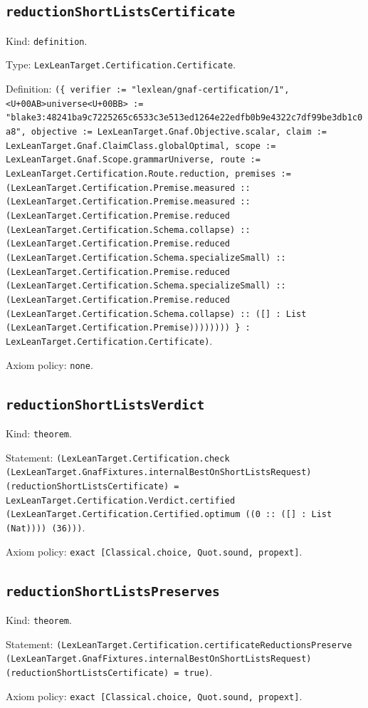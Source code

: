 \documentclass[11pt]{article}
\begin{document}
\subsection*{\texttt{reductionShortListsCertificate}}
\noindent Kind: \texttt{definition}.\par
\noindent Type: \texttt{LexLeanTarget.Certification.Certificate}.\par
\noindent Definition: \texttt{(\{ verifier := "lexlean/gnaf-certification/1", <U+00AB>universe<U+00BB> := "blake3:48241ba9c7225265c6533c3e513ed1264e22edfb0b9e4322c7df99be3db1c0a8", objective := LexLeanTarget.Gnaf.Objective.scalar, claim := LexLeanTarget.Gnaf.ClaimClass.globalOptimal, scope := LexLeanTarget.Gnaf.Scope.grammarUniverse, route := LexLeanTarget.Certification.Route.reduction, premises := (LexLeanTarget.Certification.Premise.measured :: (LexLeanTarget.Certification.Premise.measured :: (LexLeanTarget.Certification.Premise.reduced (LexLeanTarget.Certification.Schema.collapse) :: (LexLeanTarget.Certification.Premise.reduced (LexLeanTarget.Certification.Schema.specializeSmall) :: (LexLeanTarget.Certification.Premise.reduced (LexLeanTarget.Certification.Schema.specializeSmall) :: (LexLeanTarget.Certification.Premise.reduced (LexLeanTarget.Certification.Schema.collapse) :: ([] : List (LexLeanTarget.Certification.Premise)))))))) \} : LexLeanTarget.Certification.Certificate)}.\par
\noindent Axiom policy: \texttt{none}.\par
\subsection*{\texttt{reductionShortListsVerdict}}
\noindent Kind: \texttt{theorem}.\par
\noindent Statement: \texttt{(LexLeanTarget.Certification.check (LexLeanTarget.GnafFixtures.internalBestOnShortListsRequest) (reductionShortListsCertificate) = LexLeanTarget.Certification.Verdict.certified (LexLeanTarget.Certification.Certified.optimum ((0 :: ([] : List (Nat)))) (36)))}.\par
\noindent Axiom policy: \texttt{exact [Classical.choice, Quot.sound, propext]}.\par
\subsection*{\texttt{reductionShortListsPreserves}}
\noindent Kind: \texttt{theorem}.\par
\noindent Statement: \texttt{(LexLeanTarget.Certification.certificateReductionsPreserve (LexLeanTarget.GnafFixtures.internalBestOnShortListsRequest) (reductionShortListsCertificate) = true)}.\par
\noindent Axiom policy: \texttt{exact [Classical.choice, Quot.sound, propext]}.\par
\end{document}
